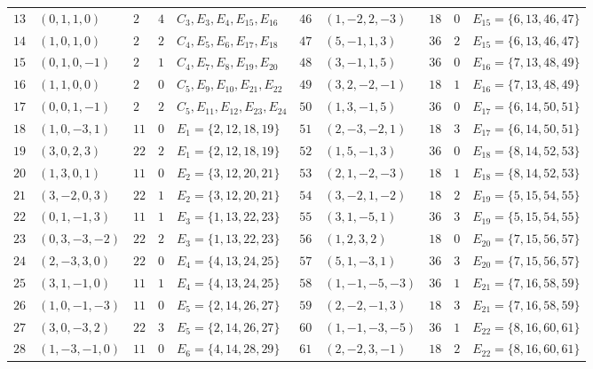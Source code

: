 \documentclass[
  aps,
  pra,
  reprint,
  superscriptaddress,
  amsmath,
  amssymb,
  nofootinbib,
  floatfix
]{revtex4-2}
\theoremstyle{definition}
\theoremstyle{remark}
\begin{document}
\begin{table}[t]
\begin{ruledtabular}
\begin{tabular}{rllll|rllll}
$13$ & $(0,1,1,0)$     & $2$  & $4$ & $C_3,E_3,E_4,E_{15},E_{16}$ &
$46$ & $(1,-2,2,-3)$   & $18$ & $0$ & $E_{15}=\{6,13,46,47\}$ \\
$14$ & $(1,0,1,0)$     & $2$  & $2$ & $C_4,E_5,E_6,E_{17},E_{18}$ &
$47$ & $(5,-1,1,3)$    & $36$ & $2$ & $E_{15}=\{6,13,46,47\}$ \\
$15$ & $(0,1,0,-1)$    & $2$  & $1$ & $C_4,E_7,E_8,E_{19},E_{20}$ &
$48$ & $(3,-1,1,5)$    & $36$ & $0$ & $E_{16}=\{7,13,48,49\}$ \\
$16$ & $(1,1,0,0)$     & $2$  & $0$ & $C_5,E_9,E_{10},E_{21},E_{22}$ &
$49$ & $(3,2,-2,-1)$   & $18$ & $1$ & $E_{16}=\{7,13,48,49\}$ \\
$17$ & $(0,0,1,-1)$    & $2$  & $2$ & $C_5,E_{11},E_{12},E_{23},E_{24}$ &
$50$ & $(1,3,-1,5)$    & $36$ & $0$ & $E_{17}=\{6,14,50,51\}$ \\
$18$ & $(1,0,-3,1)$    & $11$ & $0$ & $E_1=\{2,12,18,19\}$ &
$51$ & $(2,-3,-2,1)$   & $18$ & $3$ & $E_{17}=\{6,14,50,51\}$ \\
$19$ & $(3,0,2,3)$     & $22$ & $2$ & $E_1=\{2,12,18,19\}$ &
$52$ & $(1,5,-1,3)$    & $36$ & $0$ & $E_{18}=\{8,14,52,53\}$ \\
$20$ & $(1,3,0,1)$     & $11$ & $0$ & $E_2=\{3,12,20,21\}$ &
$53$ & $(2,1,-2,-3)$   & $18$ & $1$ & $E_{18}=\{8,14,52,53\}$ \\
$21$ & $(3,-2,0,3)$    & $22$ & $1$ & $E_2=\{3,12,20,21\}$ &
$54$ & $(3,-2,1,-2)$   & $18$ & $2$ & $E_{19}=\{5,15,54,55\}$ \\
$22$ & $(0,1,-1,3)$    & $11$ & $1$ & $E_3=\{1,13,22,23\}$ &
$55$ & $(3,1,-5,1)$    & $36$ & $3$ & $E_{19}=\{5,15,54,55\}$ \\
$23$ & $(0,3,-3,-2)$   & $22$ & $2$ & $E_3=\{1,13,22,23\}$ &
$56$ & $(1,2,3,2)$     & $18$ & $0$ & $E_{20}=\{7,15,56,57\}$ \\
$24$ & $(2,-3,3,0)$    & $22$ & $0$ & $E_4=\{4,13,24,25\}$ &
$57$ & $(5,1,-3,1)$    & $36$ & $3$ & $E_{20}=\{7,15,56,57\}$ \\
$25$ & $(3,1,-1,0)$    & $11$ & $1$ & $E_4=\{4,13,24,25\}$ &
$58$ & $(1,-1,-5,-3)$  & $36$ & $1$ & $E_{21}=\{7,16,58,59\}$ \\
$26$ & $(1,0,-1,-3)$   & $11$ & $0$ & $E_5=\{2,14,26,27\}$ &
$59$ & $(2,-2,-1,3)$   & $18$ & $3$ & $E_{21}=\{7,16,58,59\}$ \\
$27$ & $(3,0,-3,2)$    & $22$ & $3$ & $E_5=\{2,14,26,27\}$ &
$60$ & $(1,-1,-3,-5)$  & $36$ & $1$ & $E_{22}=\{8,16,60,61\}$ \\
$28$ & $(1,-3,-1,0)$   & $11$ & $0$ & $E_6=\{4,14,28,29\}$ &
$61$ & $(2,-2,3,-1)$   & $18$ & $2$ & $E_{22}=\{8,16,60,61\}$ \\

\end{tabular}
\end{ruledtabular}
\end{table}
\end{document}
